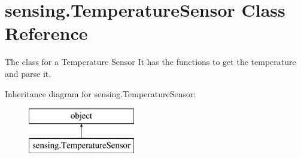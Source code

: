\hypertarget{classsensing_1_1_temperature_sensor}{\section{sensing.\-Temperature\-Sensor Class Reference}
\label{classsensing_1_1_temperature_sensor}
}


The class for a Temperature Sensor It has the functions to get the temperature and parse it.  


Inheritance diagram for sensing.\-Temperature\-Sensor\-:\begin{figure}[H]
\begin{center}
\leavevmode
\includegraphics[height=2.000000cm]{classsensing_1_1_temperature_sensor}
\end{center}
\end{figure}
